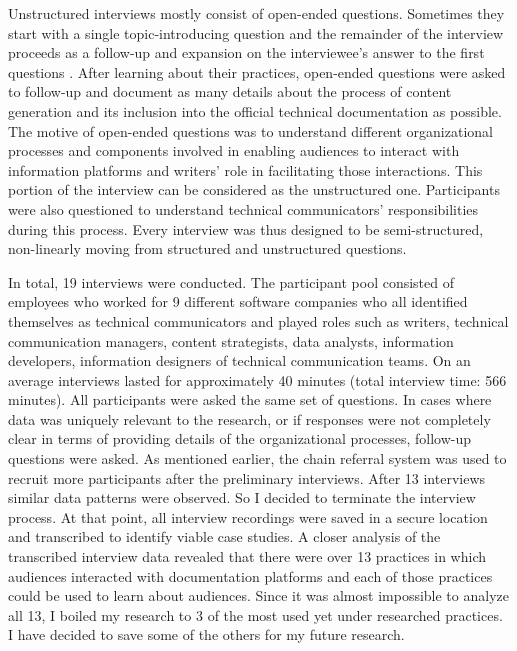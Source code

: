 Unstructured interviews mostly consist of open-ended questions. Sometimes they start with a single topic-introducing question and the remainder of the interview proceeds as a follow-up and expansion on the interviewee’s answer to the first questions \cite{kvale19961}. After learning about their practices, open-ended questions were asked to follow-up and document as many details about the process of content generation and its inclusion into the official technical documentation as possible. The motive of open-ended questions was to understand different organizational processes and components involved in enabling audiences to interact with information platforms and writers' role in facilitating those interactions. This portion of the interview can be considered as the unstructured one. Participants were also questioned to understand technical communicators’ responsibilities during this process. Every interview was thus designed to be semi-structured, non-linearly moving from structured and unstructured questions.

In total, 19 interviews were conducted. The participant pool consisted of employees who worked for 9 different software companies who all identified themselves as technical communicators and played roles such as writers, technical communication managers, content strategists, data analysts, information developers, information designers of technical communication teams. On an average interviews lasted for approximately 40 minutes (total interview time: 566 minutes). All participants were asked the same set of questions. In cases where data was uniquely relevant to the research, or if responses were not completely clear in terms of providing details of the organizational processes, follow-up questions were asked. As mentioned earlier, the chain referral system was used to recruit more participants after the preliminary interviews. After 13 interviews similar data patterns were observed. So I decided to terminate the interview process. At that point, all interview recordings were saved in a secure location and transcribed to identify viable case studies. A closer analysis of the transcribed interview data revealed that there were over 13 practices in which audiences interacted with documentation platforms and each of those practices could be used to learn about audiences. Since it was almost impossible to analyze all 13, I boiled my research to 3 of the most used yet under researched practices. I have decided to save some of the others for my future research.

